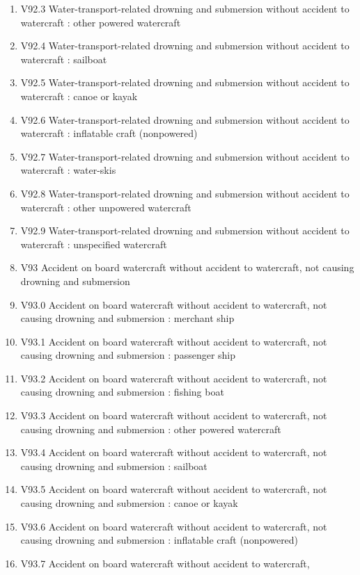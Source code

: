 \documentclass[
]{scrartcl}
\begin{document}
\begin{itemize}
\begin{enumerate}
  \item
    V92.3 Water-transport-related drowning and submersion without
    accident to watercraft : other powered watercraft
  \item
    V92.4 Water-transport-related drowning and submersion without
    accident to watercraft : sailboat
  \item
    V92.5 Water-transport-related drowning and submersion without
    accident to watercraft : canoe or kayak
  \item
    V92.6 Water-transport-related drowning and submersion without
    accident to watercraft : inflatable craft (nonpowered)
  \item
    V92.7 Water-transport-related drowning and submersion without
    accident to watercraft : water-skis
  \item
    V92.8 Water-transport-related drowning and submersion without
    accident to watercraft : other unpowered watercraft
  \item
    V92.9 Water-transport-related drowning and submersion without
    accident to watercraft : unspecified watercraft
  \item
    V93 Accident on board watercraft without accident to watercraft, not
    causing drowning and submersion
  \item
    V93.0 Accident on board watercraft without accident to watercraft,
    not causing drowning and submersion : merchant ship
  \item
    V93.1 Accident on board watercraft without accident to watercraft,
    not causing drowning and submersion : passenger ship
  \item
    V93.2 Accident on board watercraft without accident to watercraft,
    not causing drowning and submersion : fishing boat
  \item
    V93.3 Accident on board watercraft without accident to watercraft,
    not causing drowning and submersion : other powered watercraft
  \item
    V93.4 Accident on board watercraft without accident to watercraft,
    not causing drowning and submersion : sailboat
  \item
    V93.5 Accident on board watercraft without accident to watercraft,
    not causing drowning and submersion : canoe or kayak
  \item
    V93.6 Accident on board watercraft without accident to watercraft,
    not causing drowning and submersion : inflatable craft (nonpowered)
  \item
    V93.7 Accident on board watercraft without accident to watercraft,

\end{enumerate}
\end{itemize}
\end{document}
